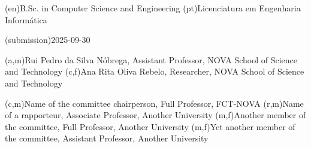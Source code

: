 \ntauthordegree(en){B.Sc. in Computer Science and Engineering}
\ntauthordegree(pt){Licenciatura em Engenharia Informática}

 \ntdate(submission){2025-09-30}

(a,m){Rui Pedro da Silva Nóbrega, Assistant Professor, NOVA School of Science and Technology}
(c,f){Ana Rita Oliva Rebelo, Researcher, NOVA School of Science and Technology}

(c,m){Name of the committee chairperson, Full Professor, FCT-NOVA}
(r,m){Name of a rapporteur, Associate Professor, Another University}
(m,f){Another member of the committee, Full Professor, Another University}
(m,f){Yet another member of the committee, Assistant Professor, Another University}

